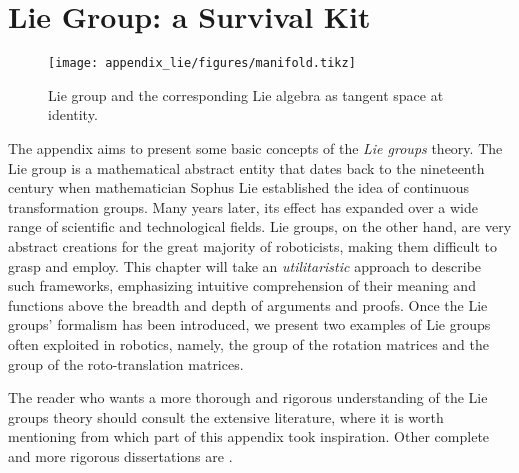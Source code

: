 
\chapter{Lie Group: a Survival
Kit\label{appendix:lie}}  %


\begin{figure}[t]
    \centering
    \texttt{[image: appendix\_lie/figures/manifold.tikz]}
    \caption{Lie group and the corresponding Lie algebra as tangent space at identity.}
    \label{fig:lie_group_algebra}
\end{figure}

The appendix aims to present some basic concepts of the \emph{Lie groups} theory.  The Lie group is a mathematical abstract entity that dates back to the nineteenth century when mathematician Sophus Lie established the idea of continuous transformation groups. Many years later, its effect has expanded over a wide range of scientific and technological fields. Lie groups, on the other hand, are very abstract creations for the great majority of roboticists, making them difficult to grasp and employ. This chapter will take an \emph{utilitaristic} approach to describe such frameworks, emphasizing intuitive comprehension of their meaning and functions above the breadth and depth of arguments and proofs. Once the Lie groups' formalism has been introduced, we present two examples of Lie groups often exploited in robotics, namely, the group of the rotation matrices and the group of the roto-translation matrices.
\par
The reader who wants a more thorough and rigorous understanding of the Lie groups theory should consult the extensive literature, where it is worth mentioning \citep{Sola2018ARobotics} from which part of this appendix took inspiration. Other complete and more rigorous dissertations are \citep{Warner1971,Hall2015,Kirillov2008AnAlgebras,Howe1983VeryTheory}.


